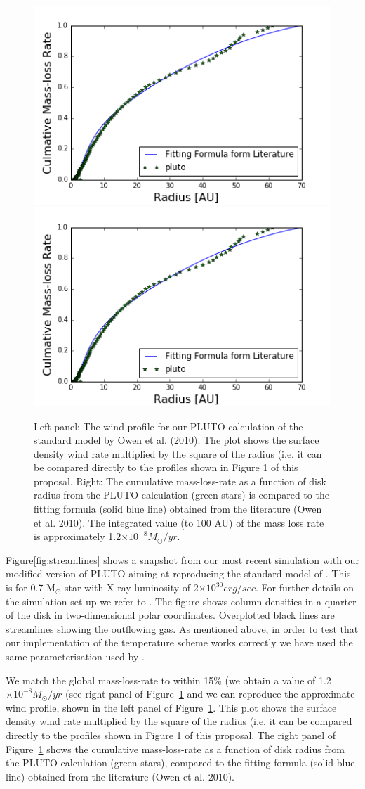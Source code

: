 \documentclass[10pt,fleqn,twoside]{article}
\begin{document}
\begin{figure}
  \includegraphics[width=0.45\linewidth]{cmdot_compare.png}
  \includegraphics[width=0.45\linewidth]{cmdot_compare.png}
  \caption{Left panel: The wind profile for our PLUTO calculation of the standard
    model by Owen et al. (2010). The plot shows the surface density
    wind rate multiplied by the square of the 
    radius (i.e. it can be compared directly to the profiles shown in
    Figure 1 of this proposal. Right: The cumulative mass-loss-rate
    as a function of disk radius from the PLUTO calculation (green
    stars) is compared to the fitting formula (solid blue line) obtained from the
    literature (Owen et al. 2010). The integrated value (to 100 AU) of the
    mass loss rate is approximately 1.2$\times 10^{-8} M_{\odot}/yr$.}
 \label{fig:sigmadot}
\end{figure}


Figure\ref{fig:streamlines} shows a snapshot from our most recent simulation
with our modified version of PLUTO 
aiming at reproducing the standard model of
\citet{2010MNRAS.401.1415O}. This is for 0.7 M$_{\odot}$ star with
X-ray luminosity of 2$\times 10^{30} erg/sec$. For further details on
the simulation set-up we refer to \citet{2010MNRAS.401.1415O}. The
figure shows column densities in a quarter of the disk in
two-dimensional polar
coordinates. Overplotted black lines are streamlines showing the
outflowing gas. As mentioned above, in order to test that our implementation of the
temperature scheme works correctly we have used the same
parameterisation used by 
\citet{2010MNRAS.401.1415O}. 

We match the global
mass-loss-rate to within 15\% (we obtain a value of 1.2$\times 10^{-8}
M_{\odot}/yr$ (see right panel of Figure~\ref{fig:sigmadot} and we can
reproduce the approximate wind profile, shown in the left panel of
Figure~\ref{fig:sigmadot}. This plot shows the surface density
   wind rate multiplied by the square of the 
   radius (i.e. it can be compared directly to the profiles shown in
  Figure 1 of this proposal. The right panel of
  Figure~\ref{fig:sigmadot} shows the cumulative mass-loss-rate
    as a function of disk radius from the PLUTO calculation (green
    stars), compared to the fitting formula (solid blue line) obtained
    from the     literature (Owen et al. 2010). 
\end{document}
